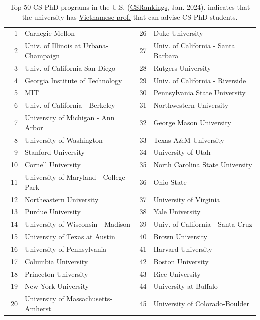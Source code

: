 \documentclass[oneside,11pt,dvipsnames]{book}
\newcommand{\red}[1]{{\color{red}{#1}}}
\begin{document}
\begin{table}
  \centering
  \small
  \caption{Top 50 CS PhD programs in the U.S. (\href{https://csrankings.org}{CSRankings}, Jan. 2024). \red{$^*$} indicates that the university has \href{https://github.com/dynaroars/dynaroars.github.io/wiki/Viet-CS-Profs-US}{Vietnamese prof.} that can advise CS PhD students.}\label{tab:ranking}
  \begin{tabular}{rl|rl}
    \toprule
    1 & Carnegie Mellon & 26 & Duke University \\
    2 & Univ. of Illinois at Urbana-Champaign\red{$^*$}  & 27 & Univ. of California - Santa Barbara \\
    3 & Univ. of California-San Diego & 28 & Rutgers University\red{$^*$} \\
    4 & Georgia Institute of Technology & 29 & Univ. of California - Riverside\\
    5 & MIT                            & 30 & Pennsylvania State University  \\
    6 & Univ. of California - Berkeley& 31 & Northwestern University\\
    7 & University of Michigan - Ann Arbor\red{$^*$}   & 32& George Mason University\red{$^*$}\\
    8 & University of Washington      &33 &  Texas A\&M University\red{$^*$} \\
    9 &  Stanford University  &34&  University of Utah \\
    10 & Cornell University  & 35 &  North Carolina State University\\\
    11 & University of Maryland - College Park &  36& Ohio State \\
    12 & Northeastern University\red{$^*$} &37& University of Virginia  \\
    13 & Purdue University &38& Yale University \\
    14 & University of Wisconsin - Madison\red{$^*$} &39 & Univ. of California - Santa Cruz \\
    15 & University of Texas at Austin &40& Brown University \\
    16 & University of Pennsylvania &41 & Harvard University \\
    17 & Columbia University\red{$^*$} &42 & Boston University  \\
    18 & Princeton University\red{$^*$}  & 43& Rice University\\
    19 & New York University  & 44&  University at Buffalo\red{$^*$}\\
    20 &  University of Massachusetts-Amherst\red{$^*$} &45& University of Colorado-Boulder \\

\end{tabular}
\end{table}
\end{document}
